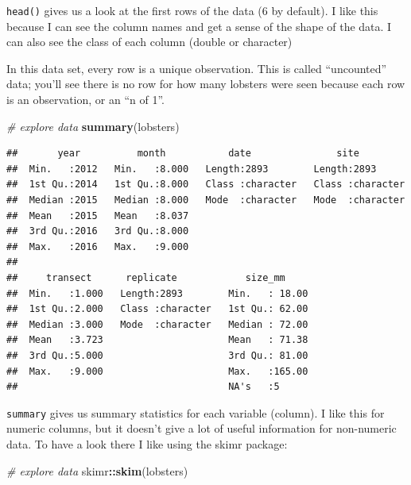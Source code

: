 \documentclass[]{book}
\newenvironment{Shaded}{\begin{snugshade}}{\end{snugshade}}
\newcommand{\CommentTok}[1]{\textcolor[rgb]{0.56,0.35,0.01}{\textit{#1}}}
\newcommand{\KeywordTok}[1]{\textcolor[rgb]{0.13,0.29,0.53}{\textbf{#1}}}
\newcommand{\NormalTok}[1]{#1}
\newcommand{\OperatorTok}[1]{\textcolor[rgb]{0.81,0.36,0.00}{\textbf{#1}}}
\begin{document}
\texttt{head()} gives us a look at the first rows of the data (6 by default). I like this because I can see the column names and get a sense of the shape of the data. I can also see the class of each column (double or character)

In this data set, every row is a unique observation. This is called ``uncounted'' data; you'll see there is no row for how many lobsters were seen because each row is an observation, or an ``n of 1''.

\begin{Shaded}
\begin{Highlighting}[]
\CommentTok{# explore data}
\KeywordTok{summary}\NormalTok{(lobsters) }
\end{Highlighting}
\end{Shaded}

\begin{verbatim}
##       year          month           date               site          
##  Min.   :2012   Min.   :8.000   Length:2893        Length:2893       
##  1st Qu.:2014   1st Qu.:8.000   Class :character   Class :character  
##  Median :2015   Median :8.000   Mode  :character   Mode  :character  
##  Mean   :2015   Mean   :8.037                                        
##  3rd Qu.:2016   3rd Qu.:8.000                                        
##  Max.   :2016   Max.   :9.000                                        
##                                                                      
##     transect      replicate            size_mm      
##  Min.   :1.000   Length:2893        Min.   : 18.00  
##  1st Qu.:2.000   Class :character   1st Qu.: 62.00  
##  Median :3.000   Mode  :character   Median : 72.00  
##  Mean   :3.723                      Mean   : 71.38  
##  3rd Qu.:5.000                      3rd Qu.: 81.00  
##  Max.   :9.000                      Max.   :165.00  
##                                     NA's   :5
\end{verbatim}

\texttt{summary} gives us summary statistics for each variable (column). I like this for numeric columns, but it doesn't give a lot of useful information for non-numeric data. To have a look there I like using the skimr package:

\begin{Shaded}
\begin{Highlighting}[]
\CommentTok{# explore data}
\NormalTok{skimr}\OperatorTok{::}\KeywordTok{skim}\NormalTok{(lobsters) }
\end{Highlighting}
\end{Shaded}
\end{document}
